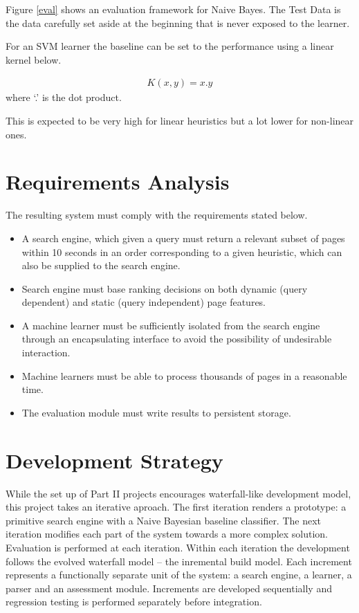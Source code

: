 \documentclass[12pt,twoside,notitlepage]{report}
\begin{document}
Figure \ref{eval} shows an evaluation framework for Naive Bayes.  The Test Data
is the data carefully set aside at the beginning that is never exposed to the
learner. 

For an SVM learner the baseline can be set to the performance using a linear
kernel below.

\begin{gather}
K(x,y) = x . y
\end{gather}
where `.' is the dot product.

This is expected to be very high for linear heuristics but a lot lower for
non-linear ones.

\section{Requirements Analysis}
The resulting system must comply with the requirements stated below. 
\begin{itemize}
  \item{A search engine, which given a query must return a relevant subset of
      pages within 10 seconds in an order corresponding to a given heuristic, which can also be
  supplied to the search engine.}
  \item{Search engine must base ranking decisions on both dynamic
      (query dependent) and static (query independent)
    page features.}
  \item{A machine learner must be sufficiently isolated from the search engine
    through an encapsulating interface to avoid the possibility of undesirable interaction.}
  \item{Machine learners must be able to process thousands of pages in a
    reasonable time.}
  \item{The evaluation module must write results to persistent storage.}
\end{itemize}
\section{Development Strategy}
While the set up of Part II projects encourages waterfall-like development
model, this project takes an iterative aproach. The first iteration renders a
prototype: a primitive search engine with a Naive Bayesian baseline classifier.
The next iteration modifies each part of the system towards a more complex
solution. Evaluation is performed at each iteration. Within each  iteration the
development follows the evolved waterfall model -- the inremental build model.
Each increment represents a functionally separate unit of the system: a search
engine, a learner, a parser and an assessment module. Increments are developed
sequentially and regression testing is performed separately before integration.
\end{document}
